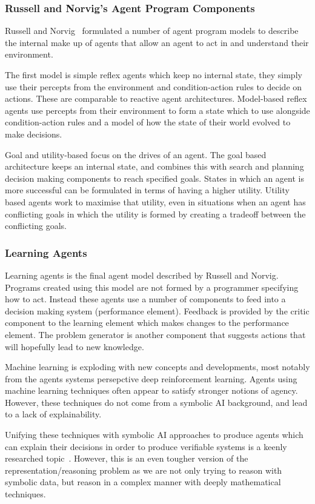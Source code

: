 \documentclass[]{final_report}
\begin{document}
\subsubsection{Russell and Norvig's Agent Program Components}
Russell and Norvig~\cite{russell2016artificial} formulated a number of agent program models to describe the internal make up of agents that allow an agent to act in and understand their environment.\par
The first model is simple reflex agents which keep no internal state, they simply use their percepts from the environment and condition-action rules to decide on actions. These are comparable to reactive agent architectures. Model-based reflex agents use percepts from their environment to form a state which to use alongside condition-action rules and a model of how the state of their world evolved to make decisions.\par 
Goal and utility-based focus on the drives of an agent. The goal based architecture keeps an internal state, and combines this with search and planning decision making components to reach specified goals. States in which an agent is more successful can be formulated in terms of having a higher utility. Utility based agents work to maximise that utility, even in situations when an agent has conflicting goals in which the utility is formed by creating a tradeoff between the conflicting goals.
\subsubsection{Learning Agents}
Learning agents is the final agent model described by Russell and Norvig. Programs created using this model are not formed by a programmer specifying how to act. Instead these agents use a number of components to feed into a decision making system (performance element). Feedback is provided by the critic component to the learning element which makes changes to the performance element. The problem generator is another component that suggests actions that will hopefully lead to new knowledge.\par 
Machine learning is exploding with new concepts and developments, most notably from the agents systems persepctive deep reinforcement learning. Agents using machine learning techniques often appear to satisfy stronger notions of agency. However, these techniques do not come from a symbolic AI background, and lead to a lack of explainability.\par 
Unifying these techniques with symbolic AI approaches to produce agents which can explain their decisions in order to produce verifiable systems is a keenly researched topic~\cite{darpaxai, garnelo2016towards}. However, this is an even tougher version of the representation/reasoning problem as we are not only trying to reason with symbolic data, but reason in a complex manner with deeply mathematical techniques.
\end{document}
